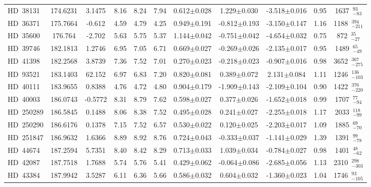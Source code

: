 {\begin{longtable}{lcccccccccc}
HD~38131 & 174.6231 & 3.1475 & 8.16 & 8.24 & 7.94 & 0.612$\pm$0.028 & 1.229$\pm$0.030 & -3.518$\pm$0.016 & 0.95 & 1637~$_{-83}^{93}$ \\
\noalign{\smallskip}
HD~36371 & 175.7664 & -0.612 & 4.59 & 4.79 & 4.25 & 0.949$\pm$0.191 & -0.812$\pm$0.193 & -3.150$\pm$0.147 & 1.16 & 1188~$_{-211}^{394}$ \\
\noalign{\smallskip}
HD~35600 & 176.764 & -2.702 & 5.63 & 5.75 & 5.37 & 1.144$\pm$0.042 & -0.751$\pm$0.042 & -4.654$\pm$0.032 & 0.75 & 872~$_{-27}^{35}$ \\
\noalign{\smallskip}
HD~39746 & 182.1813 & 1.2746 & 6.95 & 7.05 & 6.71 & 0.669$\pm$0.027 & -0.269$\pm$0.026 & -2.135$\pm$0.017 & 0.95 & 1489~$_{-49}^{65}$ \\
\noalign{\smallskip}
HD~41398 & 182.2568 & 3.8739 & 7.36 & 7.52 & 7.01 & 0.270$\pm$0.023 & -0.218$\pm$0.023 & -0.907$\pm$0.016 & 0.98 & 3652~$_{-275}^{367}$ \\
\noalign{\smallskip}
HD~93521 & 183.1403 & 62.152 & 6.97 & 6.83 & 7.20 & 0.820$\pm$0.081 & 0.389$\pm$0.072 & 2.131$\pm$0.084 & 1.11 & 1246~$_{-103}^{136}$ \\
\noalign{\smallskip}
HD~40111 & 183.9655 & 0.8388 & 4.76 & 4.72 & 4.80 & 0.904$\pm$0.179 & -1.909$\pm$0.143 & -2.109$\pm$0.104 & 0.90 & 1422~$_{-220}^{376}$ \\
\noalign{\smallskip}
HD~40003 & 186.0743 & -0.5772 & 8.31 & 8.79 & 7.62 & 0.598$\pm$0.027 & 0.377$\pm$0.026 & -1.652$\pm$0.018 & 0.99 & 1707~$_{-94}^{77}$ \\
\noalign{\smallskip}
HD~250289 & 186.5845 & 0.1488 & 8.06 & 8.38 & 7.52 & 0.495$\pm$0.028 & 0.241$\pm$0.027 & -2.255$\pm$0.018 & 1.17 & 2033~$_{-99}^{118}$ \\
\noalign{\smallskip}
HD~250290 & 186.6176 & 0.1378 & 7.15 & 7.52 & 6.57 & 0.530$\pm$0.022 & 0.120$\pm$0.025 & -2.203$\pm$0.017 & 1.09 & 1885~$_{-70}^{69}$ \\
\noalign{\smallskip}
HD~251847 & 186.9632 & 1.6366 & 8.89 & 8.92 & 8.76 & 0.724$\pm$0.043 & -0.333$\pm$0.037 & -1.141$\pm$0.029 & 1.39 & 1391~$_{-78}^{99}$ \\
\noalign{\smallskip}
HD~44674 & 187.2594 & 5.7351 & 8.40 & 8.42 & 8.29 & 0.713$\pm$0.033 & 1.039$\pm$0.034 & -0.784$\pm$0.027 & 0.98 & 1401~$_{-62}^{48}$ \\
\noalign{\smallskip}
HD~42087 & 187.7518 & 1.7688 & 5.74 & 5.76 & 5.41 & 0.429$\pm$0.062 & -0.064$\pm$0.086 & -2.685$\pm$0.056 & 1.13 & 2310~$_{-303}^{298}$ \\
\noalign{\smallskip}
HD~43384 & 187.9942 & 3.5287 & 6.11 & 6.36 & 5.66 & 0.586$\pm$0.032 & 0.604$\pm$0.032 & -1.360$\pm$0.023 & 1.04 & 1746~$_{-105}^{93}$ \\

\end{longtable}}
